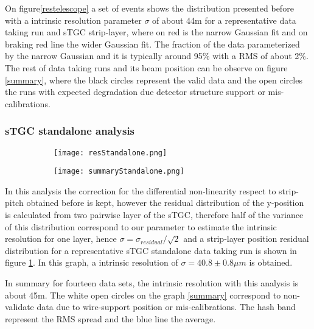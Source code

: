	On figure\ref{restelescope} a set of events shows the distribution presented before with a intrinsic resolution
	parameter $\sigma$ of about
	\unit{44}{\micro m} for a representative data taking run and sTGC strip-layer, where on red is the narrow Gaussian fit
	and on braking red line the wider Gaussian fit. The fraction of the data parameterized by the narrow Gaussian and it is
	typically around 95\% with a RMS of about 2\%. The rest of data taking runs and its beam position can be observe on
	figure \ref{summary}, where the black circles represent the valid data and the open circles the runs with expected
	degradation due detector structure support or mis-calibrations.\par






	\subsubsection{sTGC standalone analysis}
	\begin{figure}[ht]
	\centering
	\hspace*{\fill}
	\begin{subfigure}[b]{0.45\textwidth}
	\centering
	\texttt{[image: resStandalone.png]}
	\caption{}\label{pairwise}
	\end{subfigure}
	\begin{subfigure}[b]{0.45\textwidth}
	\centering
	\texttt{[image: summaryStandalone.png]}
	\caption{}\label{}
	\end{subfigure}
	\hspace*{\fill}
	\caption{}\label{}
	\end{figure}

	In this analysis the correction for the differential non-linearity respect to strip-pitch obtained before is kept,
	however the residual distribution of the y-position is calculated from two pairwise layer of the sTGC, therefore half of
	the variance of this distribution correspond to our parameter to estimate the intrinsic resolution for one layer, hence
	$\sigma = \sigma_{residual}/\sqrt{2}$ and a strip-layer position residual distribution for a representative sTGC
	standalone data taking run is shown in figure \ref{pairwise}. In this graph, a intrinsic resolution of $\sigma=40.8\pm0.8\mu m$ is obtained.\par 
	In summary for fourteen data sets, the intrinsic resolution with this analysis is about \unit{45}{\micro m}. The white open
circles on the graph \ref{summary} correspond to non-validate data due to wire-support position or mis-calibrations. The
hash band represent the RMS spread and the blue line the average.\par 



